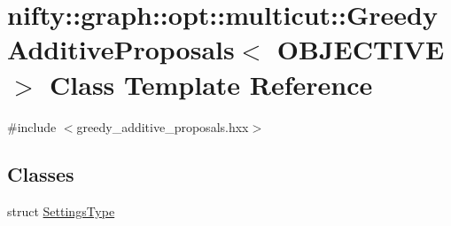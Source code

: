 \hypertarget{classnifty_1_1graph_1_1opt_1_1multicut_1_1GreedyAdditiveProposals}{}\section{nifty\+:\+:graph\+:\+:opt\+:\+:multicut\+:\+:Greedy\+Additive\+Proposals$<$ O\+B\+J\+E\+C\+T\+I\+VE $>$ Class Template Reference}
\label{classnifty_1_1graph_1_1opt_1_1multicut_1_1GreedyAdditiveProposals}


{\ttfamily \#include $<$greedy\+\_\+additive\+\_\+proposals.\+hxx$>$}

\subsection*{Classes}
\begin{DoxyCompactItemize}
\item 
struct \hyperlink{structnifty_1_1graph_1_1opt_1_1multicut_1_1GreedyAdditiveProposals_1_1SettingsType}{Settings\+Type}
\end{DoxyCompactItemize}
